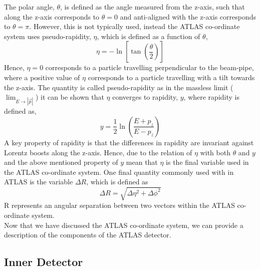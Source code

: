 The polar angle, $\theta$, is defined as the angle measured from the z-axis,
such that along the z-axis corresponds to $\theta = 0$
and anti-aligned with the z-axis corresponds to $\theta = \pi$.
However, this is not typically used, instead the ATLAS co-ordinate system uses pseudo-rapidity,
$\eta$, which is defined as a function of $\theta$,
\begin{equation}
 \eta = -\ln\left[\tan\left( \frac{\theta}{2} \right) \right]
\end{equation}
Hence, $\eta = 0$ corresponds to a particle travelling perpendicular to the beam-pipe,
where a positive value of $\eta$ corresponds to a particle travelling with a tilt towards the z-axis.
The quantity is called pseudo-rapidity as in the massless limit ($\lim_{E\to|\vec{p}|}$)
it can be shown that $\eta$ converges to rapidity, $y$, where rapidity is defined as,
\begin{equation}
  y = \frac{1}{2} \ln \left( \frac{E+p_{z}}{E-p_{z}} \right)
\end{equation}
A key property of rapidity is that the differences in rapidity are invariant against Lorentz boosts along the z-axis.
Hence, due to the relation of $\eta$ with both $\theta$ and $y$ and the above mentioned property of $y$
mean that $\eta$ is the final variable used in the ATLAS co-ordinate system.
One final quantity commonly used with in ATLAS is the variable $\Delta R$, which is defined as
\begin{equation}
  \Delta R = \sqrt{\Delta\eta^{2} + \Delta\phi^{2}}
\end{equation}
\Delta R represents an angular separation between two vectors within the ATLAS co-ordinate system.\\


Now that we have discussed the ATLAS co-ordinate system, we can provide a description of the components of the ATLAS detector.

\subsection{Inner Detector}

